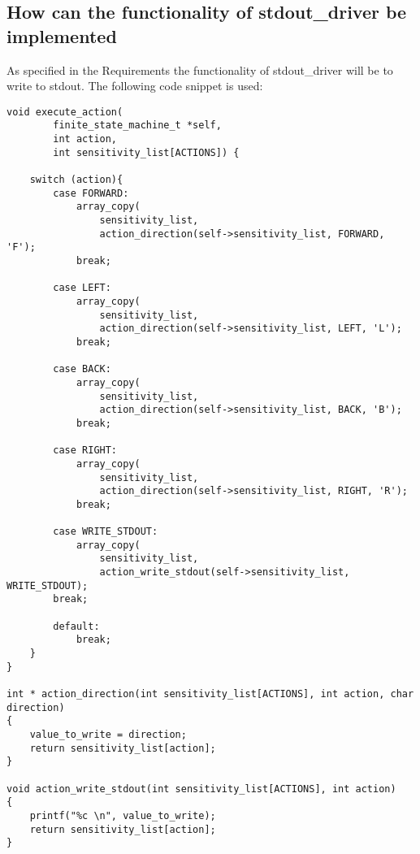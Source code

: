 \hypertarget{how-can-the-functionality-of-stdout_driver-be-implemented}{%
\subsection{How can the functionality of stdout\_driver be
implemented}\label{how-can-the-functionality-of-stdout_driver-be-implemented}}

As specified in the Requirements the functionality of stdout\_driver
will be to write to stdout. The following code snippet is used:

\begin{verbatim}
void execute_action(
        finite_state_machine_t *self,
        int action,
        int sensitivity_list[ACTIONS]) {

    switch (action){
        case FORWARD:
            array_copy(
                sensitivity_list, 
                action_direction(self->sensitivity_list, FORWARD, 'F');
            break;

        case LEFT:
            array_copy(
                sensitivity_list, 
                action_direction(self->sensitivity_list, LEFT, 'L');
            break;

        case BACK:
            array_copy(
                sensitivity_list, 
                action_direction(self->sensitivity_list, BACK, 'B');
            break;

        case RIGHT:
            array_copy(
                sensitivity_list, 
                action_direction(self->sensitivity_list, RIGHT, 'R');
            break;

        case WRITE_STDOUT:
            array_copy(
                sensitivity_list, 
                action_write_stdout(self->sensitivity_list, WRITE_STDOUT);
        break;

        default:
            break;
    }
}

int * action_direction(int sensitivity_list[ACTIONS], int action, char direction)
{
    value_to_write = direction;
    return sensitivity_list[action];
}

void action_write_stdout(int sensitivity_list[ACTIONS], int action)
{
    printf("%c \n", value_to_write);
    return sensitivity_list[action];
}
\end{verbatim}
